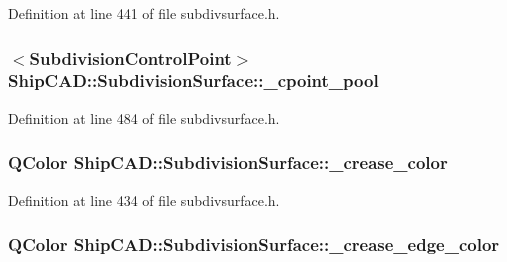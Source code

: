 Definition at line 441 of file subdivsurface.\+h.

\subsubsection[{\texorpdfstring{\+\_\+cpoint\+\_\+pool}{_cpoint_pool}}]{$<${\bf Subdivision\+Control\+Point}$>$ Ship\+C\+A\+D\+::\+Subdivision\+Surface\+::\+\_\+cpoint\+\_\+pool\hspace{0.3cm}{\ttfamily [protected]}}\hypertarget{classShipCAD_1_1SubdivisionSurface_a795f2f16f1da4aa5c0f14d441a190ce0}{}\label{classShipCAD_1_1SubdivisionSurface_a795f2f16f1da4aa5c0f14d441a190ce0}


Definition at line 484 of file subdivsurface.\+h.

\subsubsection[{\texorpdfstring{\+\_\+crease\+\_\+color}{_crease_color}}]{\setlength{\rightskip}{0pt plus 5cm}Q\+Color Ship\+C\+A\+D\+::\+Subdivision\+Surface\+::\+\_\+crease\+\_\+color\hspace{0.3cm}{\ttfamily [protected]}}\hypertarget{classShipCAD_1_1SubdivisionSurface_aaa3b772931e04f8650db2d005ae05d6a}{}\label{classShipCAD_1_1SubdivisionSurface_aaa3b772931e04f8650db2d005ae05d6a}


Definition at line 434 of file subdivsurface.\+h.

\subsubsection[{\texorpdfstring{\+\_\+crease\+\_\+edge\+\_\+color}{_crease_edge_color}}]{\setlength{\rightskip}{0pt plus 5cm}Q\+Color Ship\+C\+A\+D\+::\+Subdivision\+Surface\+::\+\_\+crease\+\_\+edge\+\_\+color\hspace{0.3cm}{\ttfamily [protected]}}\hypertarget{classShipCAD_1_1SubdivisionSurface_a6106aee9d086aa377d9a3a6a6291b54c}{}\label{classShipCAD_1_1SubdivisionSurface_a6106aee9d086aa377d9a3a6a6291b54c}


